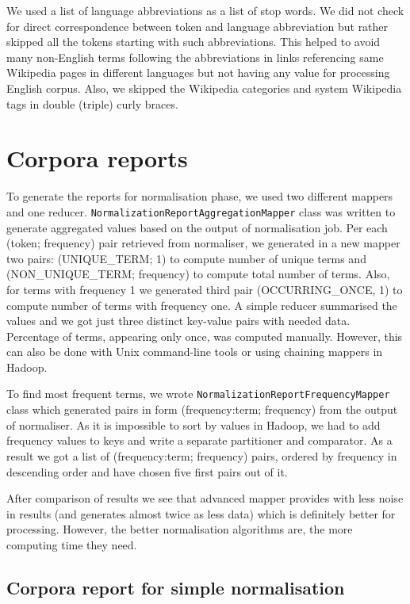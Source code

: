 \documentclass[a4paper, notitlepage]{report}
\begin{document}
We used a list of language abbreviations as a list of stop words. We did not check for direct correspondence between token and language abbreviation but rather skipped all the tokens starting with such abbreviations. This helped to avoid many non-English terms following the abbreviations in links referencing same Wikipedia pages in different languages but not having any value for processing English corpus. Also, we skipped the Wikipedia categories and system Wikipedia tags in double (triple) curly braces.

\section{Corpora reports}

To generate the reports for normalisation phase, we used two different mappers and one reducer. \lstinline{NormalizationReportAggregationMapper} class was written to generate aggregated values based on the output of normalisation job. Per each (token; frequency) pair retrieved from normaliser, we generated in a new mapper two pairs: (UNIQUE\_TERM; 1) to compute number of unique terms and (NON\_UNIQUE\_TERM; frequency) to compute total number of terms. Also, for terms with frequency 1 we generated third pair (OCCURRING\_ONCE, 1) to compute number of terms with frequency one. A simple reducer summarised the values and we got just three distinct key-value pairs with needed data. Percentage of terms, appearing only once, was computed manually. However, this can also be done with Unix command-line tools or using chaining mappers in Hadoop.

To find most frequent terms, we wrote \lstinline{NormalizationReportFrequencyMapper} class which generated pairs in form (frequency:term; frequency) from the output of normaliser. As it is impossible to sort by values in Hadoop, we had to add frequency values to keys and write a separate partitioner and comparator. As a result we got a list of (frequency:term; frequency) pairs, ordered by frequency in descending order and have chosen five first pairs out of it.

After comparison of results we see that advanced mapper provides with less noise in results (and generates almost twice as less data) which is definitely better for processing. However, the better normalisation algorithms are, the more computing time they need.  

\subsection{Corpora report for simple normalisation}
\end{document}
